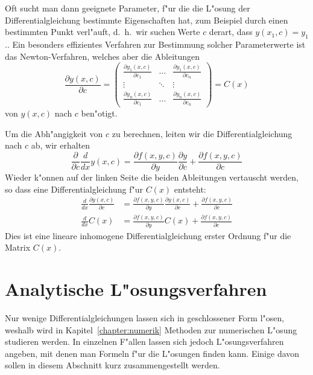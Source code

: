 Oft sucht man dann geeignete Parameter, f"ur die die L"osung der
Differentialgleichung bestimmte Eigenschaften hat, zum Beispiel durch
einen bestimmten Punkt verl"auft, d.~h.~wir suchen Werte $c$ derart,
dass $y(x_1,c)=y_1$..
Ein besonders effizientes Verfahren zur Bestimmung solcher Parameterwerte
ist das Newton-Verfahren, welches aber die Ableitungen
\[
\frac{\partial y(x,c)}{\partial c}
=
\begin{pmatrix}
\displaystyle \frac{\partial y_1(x,c)}{\partial c_1}
	&\dots
		&\displaystyle \frac{\partial y_1(x,c)}{\partial c_n}\\
\vdots
	&\ddots
		&\vdots\\
\displaystyle \frac{\partial y_n(x,c)}{\partial c_1}
	&\dots
		&\displaystyle \frac{\partial y_n(x,c)}{\partial c_n}
\end{pmatrix}
=C(x)
\]
von $y(x,c)$ nach $c$ ben"otigt.

Um die Abh"angigkeit von $c$ zu berechnen, leiten wir die
Differentialgleichung nach $c$ ab, wir erhalten 
\[
\frac{\partial}{\partial c} \frac{d}{dx} y(x,c)
=
\frac{\partial f(x,y,c)}{\partial y}\frac{\partial y}{\partial c}
+
\frac{\partial f(x,y,c)}{\partial c}
\]
Wieder k"onnen auf der linken Seite die beiden Ableitungen vertauscht
werden, so dass eine Differentialgleichung f"ur $C(x)$ entsteht:
\begin{align*}
\frac{d}{dx}\frac{\partial y(x,c)}{\partial c}
&=
\frac{\partial f(x,y,c)}{\partial y}\frac{\partial y(x,c)}{\partial c}
+
\frac{\partial f(x,y,c)}{\partial c}
\\
\frac{d}{dx}C(x)
&=
\frac{\partial f(x,y,c)}{\partial y}C(x)
+
\frac{\partial f(x,y,c)}{\partial c}
\end{align*}
Dies ist eine lineare inhomogene Differentialgleichung erster Ordnung
f"ur die Matrix $C(x)$.

\section{Analytische L"osungsverfahren\label{section:analytischeverfahren}}
Nur wenige Differentialgleichungen lassen sich in geschlossener Form
l"osen, weshalb wird in Kapitel~\ref{chapter:numerik} Methoden zur
numerischen L"osung studieren werden.
In einzelnen F"allen lassen sich jedoch L"osungsverfahren angeben,
mit denen man Formeln f"ur die L"osungen finden kann.
Einige davon sollen in diesem Abschnitt kurz zusammengestellt werden.

